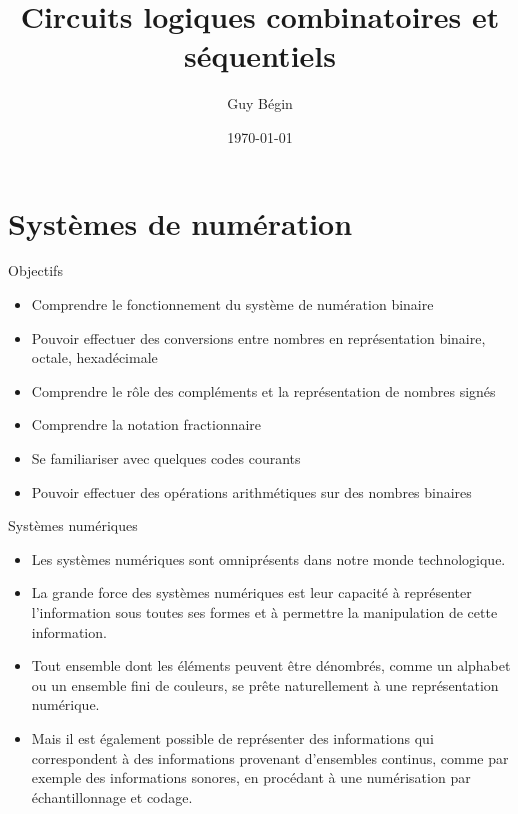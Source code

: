 \documentclass[presentation]{beamer}
\author{Guy Bégin}
\date{\today}
\title{Circuits logiques combinatoires et séquentiels}
\begin{document}
\maketitle

\section{Systèmes de numération}
\label{sec:org49470d6}


\begin{frame}[label={sec:org09a3009}]{Objectifs}
\begin{itemize}
\item Comprendre le fonctionnement du système de numération binaire
\item Pouvoir effectuer des conversions entre nombres en représentation
binaire, octale, hexadécimale
\item Comprendre le rôle des compléments et la représentation de nombres signés
\item Comprendre la notation fractionnaire
\item Se familiariser avec quelques codes courants
\item Pouvoir effectuer des opérations arithmétiques sur des nombres binaires
\end{itemize}
\end{frame}

\begin{frame}[label={sec:orgb13c279}]{Systèmes numériques}
\begin{itemize}
\item Les systèmes numériques sont omniprésents dans notre monde technologique.

\item La grande force des systèmes numériques est leur capacité à représenter l'information sous toutes ses formes et à permettre la manipulation de cette information.

\item Tout ensemble dont les éléments peuvent être dénombrés, comme un alphabet ou un ensemble fini de couleurs, se prête naturellement à une représentation numérique.

\item Mais il est également possible de représenter des informations qui correspondent à des informations provenant d'ensembles continus, comme par exemple des informations sonores, en procédant à une numérisation par échantillonnage et codage.
\end{itemize}
\end{frame}
\end{document}
